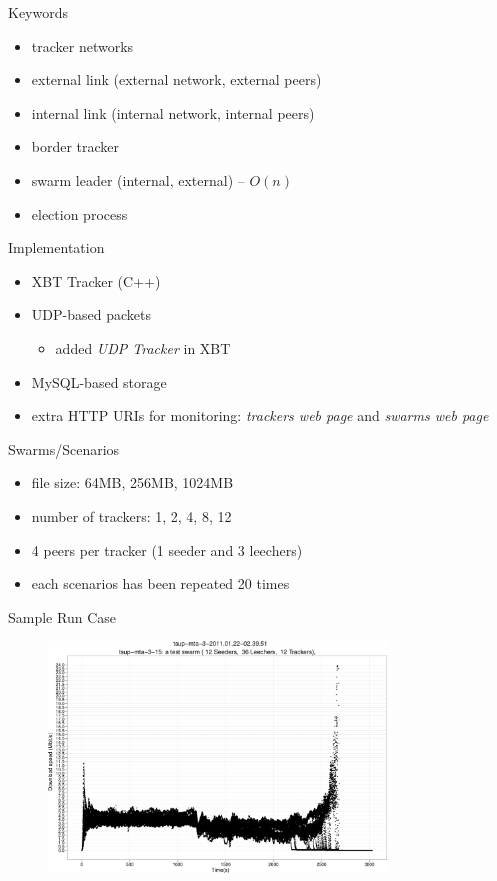 \documentclass{beamer}
\begin{document}
\begin{frame}{Keywords}
  \begin{itemize}
    \item tracker networks
    \item external link (external network, external peers)
    \item internal link (internal network, internal peers)
    \item border tracker
    \item swarm leader (internal, external) -- $O(n)$
    \item election process
  \end{itemize}
\end{frame}

\begin{frame}{Implementation}
  \begin{itemize}
    \item XBT Tracker (C++)
    \item UDP-based packets
      \begin{itemize}
        \item added \textit{UDP Tracker} in XBT
      \end{itemize}
    \item MySQL-based storage
    \item extra HTTP URIs for monitoring: \textit{trackers web page} and
    \textit{swarms web page}
  \end{itemize}
\end{frame}

\begin{frame}{Swarms/Scenarios}
  \begin{itemize}
    \item file size: 64MB, 256MB, 1024MB
    \item number of trackers: 1, 2, 4, 8, 12
    \item 4 peers per tracker (1 seeder and 3 leechers)
    \item each scenarios has been repeated 20 times
  \end{itemize}
\end{frame}

\begin{frame}{Sample Run Case}
  \begin{figure}
    \includegraphics[width=0.8\textwidth]{img/tsup-sample-run-48peers.png}
  \end{figure}
\end{frame}
\end{document}
